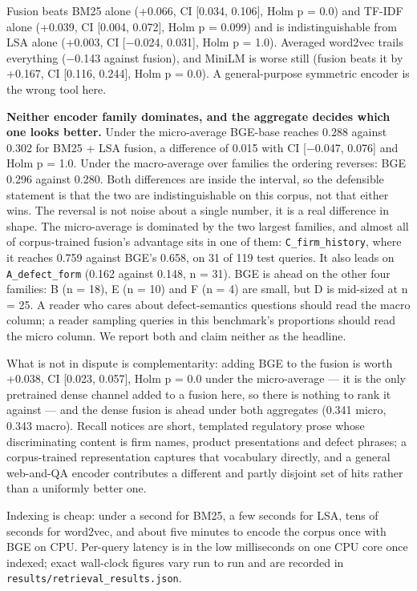 \documentclass[runningheads]{llncs}
\begin{document}
Fusion beats BM25 alone (+0.066, CI [0.034, 0.106], Holm p = 0.0) and TF-IDF alone (+0.039, CI [0.004, 0.072], Holm p = 0.099) and is indistinguishable from LSA alone (+0.003, CI [$-$0.024, 0.031], Holm p = 1.0). Averaged word2vec trails everything ($-$0.143 against fusion), and MiniLM is worse still (fusion beats it by +0.167, CI [0.116, 0.244], Holm p = 0.0). A general-purpose symmetric encoder is the wrong tool here.

\textbf{Neither encoder family dominates, and the aggregate decides which one looks better.} Under the micro-average BGE-base reaches 0.288 against 0.302 for BM25 + LSA fusion, a difference of 0.015 with CI [$-$0.047, 0.076] and Holm p = 1.0. Under the macro-average over families the ordering reverses: BGE 0.296 against 0.280. Both differences are inside the interval, so the defensible statement is that the two are indistinguishable on this corpus, not that either wins. The reversal is not noise about a single number, it is a real difference in shape. The micro-average is dominated by the two largest families, and almost all of corpus-trained fusion's advantage sits in one of them: \texttt{C\_firm\_history}, where it reaches 0.759 against BGE's 0.658, on 31 of 119 test queries. It also leads on \texttt{A\_defect\_form} (0.162 against 0.148, n = 31). BGE is ahead on the other four families: B (n = 18), E (n = 10) and F (n = 4) are small, but D is mid-sized at n = 25. A reader who cares about defect-semantics questions should read the macro column; a reader sampling queries in this benchmark's proportions should read the micro column. We report both and claim neither as the headline.

What is not in dispute is complementarity: adding BGE to the fusion is worth +0.038, CI [0.023, 0.057], Holm p = 0.0 under the micro-average --- it is the only pretrained dense channel added to a fusion here, so there is nothing to rank it against --- and the dense fusion is ahead under both aggregates (0.341 micro, 0.343 macro). Recall notices are short, templated regulatory prose whose discriminating content is firm names, product presentations and defect phrases; a corpus-trained representation captures that vocabulary directly, and a general web-and-QA encoder contributes a different and partly disjoint set of hits rather than a uniformly better one.

Indexing is cheap: under a second for BM25, a few seconds for LSA, tens of seconds for word2vec, and about five minutes to encode the corpus once with BGE on CPU. Per-query latency is in the low milliseconds on one CPU core once indexed; exact wall-clock figures vary run to run and are recorded in \texttt{results/retrieval\_\allowbreak{}results.json}.
\end{document}
